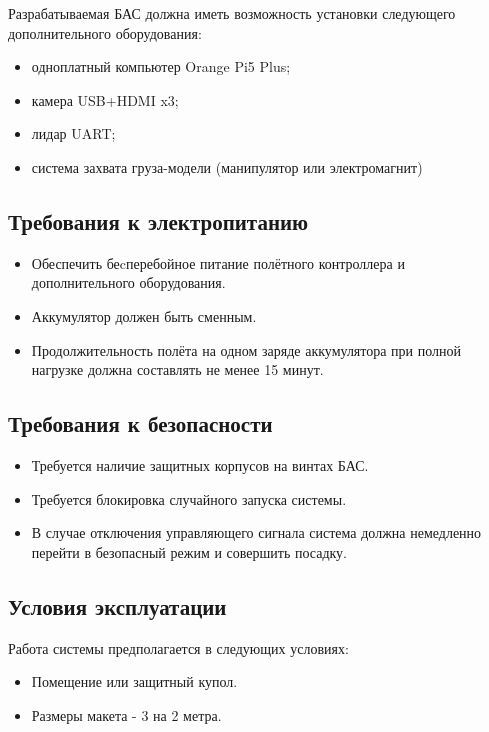 \documentclass[a4paper, 14pt]{extarticle}
\begin{document}
Разрабатываемая БАС должна иметь возможность установки следующего дополнительного оборудования:

\begin{itemize}
  \item одноплатный компьютер Orange Pi5 Plus;
  \item камера USB+HDMI x3;
  \item лидар UART;
  \item система захвата груза-модели (манипулятор или электромагнит)
\end{itemize}

\subsection{Требования к электропитанию}

\begin{itemize}
  \item Обеспечить беcперебойное питание полётного контроллера и дополнительного оборудования.
  \item Аккумулятор должен быть сменным.
  \item Продолжительность полёта на одном заряде аккумулятора при полной нагрузке должна составлять не менее 15 минут. 
\end{itemize}

\subsection{Требования к безопасности}

\begin{itemize}
  \item Требуется наличие защитных корпусов на винтах БАС.
  \item Требуется блокировка случайного запуска системы.
  \item В случае отключения управляющего сигнала система должна немедленно перейти в безопасный режим и совершить посадку.
\end{itemize}

\subsection{Условия эксплуатации}

Работа системы предполагается в следующих условиях:

\begin{itemize}
  \item Помещение или защитный купол.
  \item Размеры макета - 3 на 2 метра.
\end{itemize}
\end{document}

